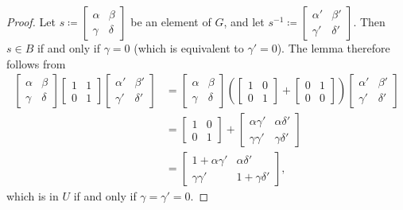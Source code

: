 \documentclass[../main.tex]{subfiles}
\begin{document}
\begin{proof}
	Let $s\coloneqq\begin{bmatrix}
		\alpha & \beta \\
		\gamma & \delta
	\end{bmatrix}$ be an element of $G$, and let $s^{-1}\coloneqq\begin{bmatrix}
		\alpha' & \beta '\\
		\gamma' & \delta'
	\end{bmatrix}$. Then $s\in B$ if and only if $\gamma=0$ (which is equivalent to $\gamma'=0$). The lemma therefore follows from
	\begin{align*}
		\begin{bmatrix}
			\alpha & \beta \\
			\gamma & \delta
		\end{bmatrix}\begin{bmatrix}
			1 & 1 \\
			0 & 1
		\end{bmatrix}\begin{bmatrix}
			\alpha' & \beta' \\
			\gamma' & \delta'
		\end{bmatrix} &= \begin{bmatrix}
			\alpha & \beta \\
			\gamma & \delta
		\end{bmatrix}\left(\begin{bmatrix}
			1 & 0 \\
			0 & 1
		\end{bmatrix}+\begin{bmatrix}
			0 & 1 \\
			0 & 0
		\end{bmatrix}\right)\begin{bmatrix}
			\alpha' & \beta' \\
			\gamma' & \delta'
		\end{bmatrix} \\
		&= \begin{bmatrix}
			1 & 0 \\
			0 & 1
		\end{bmatrix}+\begin{bmatrix}
			\alpha\gamma' & \alpha\delta' \\
			\gamma\gamma' & \gamma\delta'
		\end{bmatrix} \\
		&= \begin{bmatrix}
			1+\alpha\gamma' & \alpha\delta' \\
			\gamma\gamma' & 1+\gamma\delta'
		\end{bmatrix},
	\end{align*}
	which is in $U$ if and only if $\gamma=\gamma'=0$.
\end{proof}
\end{document}

